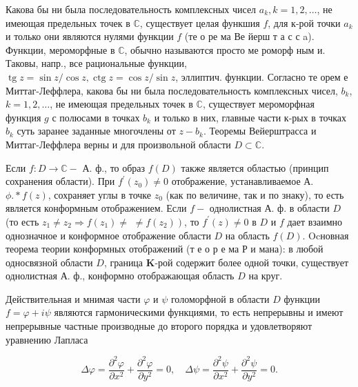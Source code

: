 \documentclass[10pt]{article}
\begin{document}
Какова бы ни была последовательность комплексных чисел $a_{k}, k=1,2, \ldots$, не имеющая предельных точек в $\mathbb{C}$, существует целая функшия $f$, для к-рой точки $a_{k}$ и только они являются нулями функции $f$ (те о ре ма Ве йерш т а с с a). Функции, мероморфные в $\mathbb{C}$, обычно называются просто ме роморф ным и. Таковы, напр., все рациональные функции, $\operatorname{tg} z=\sin z / \cos z, \operatorname{ctg} z=\cos z / \sin z$, эллиптич. функции. Согласно те орем е Миттаг-Леффлера, какова бы ни была последовательность комплексных чисел, $b_{k}$, $k=1,2, \ldots$, не имеющая предельных точек в $\mathbb{C}$, существует мероморфная функция $g$ с полюсами в точках $b_{k}$ и только в них, главные части к-рых в точках $b_{k}$ суть заранее заданные многочлены от $z-b_{k}$. Теоремы Вейерштрасса и Миттаг-Леффлера верны и для произвольной области $D \subset \mathbb{C}$.



Если $f: D \rightarrow \mathbb{C}-$ А. ф., то образ $f(D)$ также является областью (принцип сохранения области). При $f^{\prime}\left(z_{0}\right) \neq 0$ отображение, устанавливаемое А. $\phi . * f(z)$, сохраняет углы в точке $z_{0}$ (как по величине, так и по знаку), то есть является конформным отображением. Если $f-$ однолистная А. ф. в области $D$ (то есть $z_{1} \neq z_{2} \Rightarrow f\left(z_{1}\right) \neq$ $\left.\neq f\left(z_{2}\right)\right)$, то $f^{\prime}(z) \neq 0$ в $D$ и $f$ дает взаимно однозначное и конформное отображение области $D$ на область $f(D)$. Ocновная теорема теории конформных отображений (т е о р е ма Р и мана): в любой односвязной области $D$, граница $\mathbf{K}$-рой содержит более одной точки, существует однолистная А. ф., конформно отображающая область $D$ на круг.



Действительная и мнимая части $\varphi$ и $\psi$ голоморфной в области $D$ функции $f=\varphi+i \psi$ являются гармоническими функциями, то есть непрерывны и имеют непрерывные частные производные до второго порядка и удовлетворяют уравнению Лапласа



\[

\Delta \varphi=\frac{\partial^{2} \varphi}{\partial x^{2}}+\frac{\partial^{2} \varphi}{\partial y^{2}}=0, \quad \Delta \psi=\frac{\partial^{2} \psi}{\partial x^{2}}+\frac{\partial^{2} \psi}{\partial y^{2}}=0 .

\]
\end{document}
